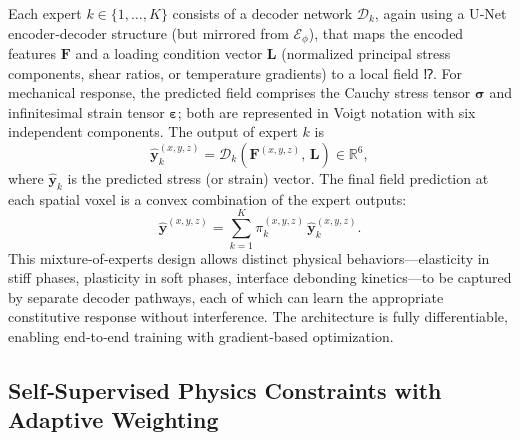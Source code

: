 \documentclass{article}
\begin{document}
Each expert \(k \in \{1,\dots,K\}\) consists of a decoder network \(\mathcal{D}_k\), again using a U‑Net encoder‑decoder structure (but mirrored from \(\mathcal{E}_\phi\)), that maps the encoded features \(\mathbf{F}\) and a loading condition vector \(\mathbf{L}\) (normalized principal stress components, shear ratios, or temperature gradients) to a local field ⁉. For mechanical response, the predicted field comprises the Cauchy stress tensor \(\boldsymbol{\sigma}\) and infinitesimal strain tensor \(\boldsymbol{\varepsilon}\); both are represented in Voigt notation with six independent components. The output of expert \(k\) is
\begin{equation}
  \hat{\mathbf{y}}_k^{(x,y,z)} = \mathcal{D}_k\!\left(\mathbf{F}^{(x,y,z)},\, \mathbf{L}\right) \in \mathbb{R}^6,
\end{equation}
where \(\hat{\mathbf{y}}_k\) is the predicted stress (or strain) vector. The final field prediction at each spatial voxel is a convex combination of the expert outputs:
\begin{equation}
  \hat{\mathbf{y}}^{(x,y,z)} = \sum_{k=1}^K \pi_k^{(x,y,z)} \,\hat{\mathbf{y}}_k^{(x,y,z)}.
\end{equation}
This mixture‑of‑experts design allows distinct physical behaviors—elasticity in stiff phases, plasticity in soft phases, interface debonding kinetics—to be captured by separate decoder pathways, each of which can learn the appropriate constitutive response without interference. The architecture is fully differentiable, enabling end‑to‑end training with gradient‑based optimization.

\subsection{Self‑Supervised Physics Constraints with Adaptive Weighting}
\label{sec:physics}
\end{document}
